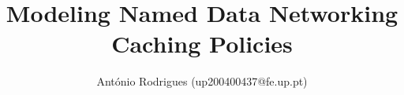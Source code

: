 \documentclass[english,journal]{IEEEtran}
\begin{document}
\title{Modeling Named Data Networking Caching Policies}
\author{António Rodrigues (up200400437@fe.up.pt)}

\maketitle




















\end{document}
